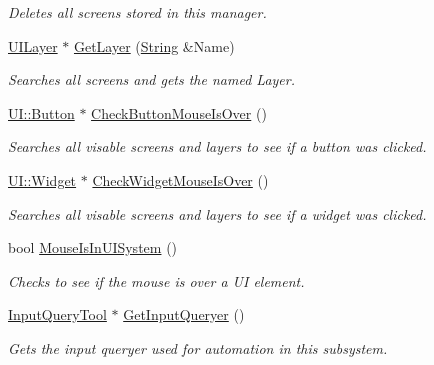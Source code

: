 \begin{DoxyCompactItemize}
\begin{DoxyCompactList}\small\item\em Deletes all screens stored in this manager. \item\end{DoxyCompactList}\item 
\hyperlink{classphys_1_1UILayer}{UILayer} $\ast$ \hyperlink{classphys_1_1UIManager_ad80ed1716853f6e09cadc5f896e875e8}{GetLayer} (\hyperlink{namespacephys_aa03900411993de7fbfec4789bc1d392e}{String} \&Name)
\begin{DoxyCompactList}\small\item\em Searches all screens and gets the named Layer. \item\end{DoxyCompactList}\item 
\hyperlink{classphys_1_1UI_1_1Button}{UI::Button} $\ast$ \hyperlink{classphys_1_1UIManager_aa1022fcbe8e1efc7a383b2eff834a152}{CheckButtonMouseIsOver} ()
\begin{DoxyCompactList}\small\item\em Searches all visable screens and layers to see if a button was clicked. \item\end{DoxyCompactList}\item 
\hyperlink{classphys_1_1UI_1_1Widget}{UI::Widget} $\ast$ \hyperlink{classphys_1_1UIManager_ab9840b483409d3453a67931b4d858d1b}{CheckWidgetMouseIsOver} ()
\begin{DoxyCompactList}\small\item\em Searches all visable screens and layers to see if a widget was clicked. \item\end{DoxyCompactList}\item 
bool \hyperlink{classphys_1_1UIManager_a38bc8d2ed1930a8ff6e82ef5f991dbe1}{MouseIsInUISystem} ()
\begin{DoxyCompactList}\small\item\em Checks to see if the mouse is over a UI element. \item\end{DoxyCompactList}\item 
\hyperlink{classphys_1_1InputQueryTool}{InputQueryTool} $\ast$ \hyperlink{classphys_1_1UIManager_a7b88d0fe2271cdceccf879eaba1b1a64}{GetInputQueryer} ()
\begin{DoxyCompactList}\small\item\em Gets the input queryer used for automation in this subsystem. \item\end{DoxyCompactList}\item 

\end{DoxyCompactItemize}
